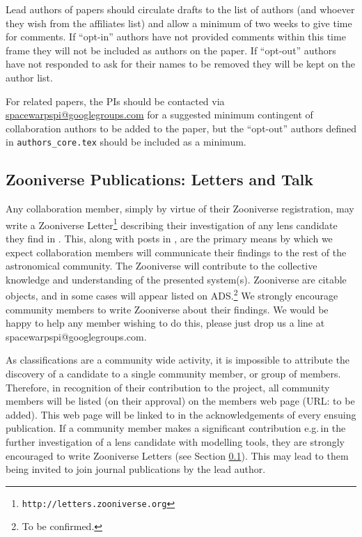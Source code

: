 \documentclass[a4paper]{article}
\begin{document}
Lead authors of \sw papers should circulate drafts to the list of authors (and whoever they wish from the affiliates list) and allow a minimum of two weeks to give time for comments. If  ``opt-in'' authors have not provided comments within this time frame they will not be included as authors on the paper. If ``opt-out'' authors have not responded to ask for their names to be removed they will be kept on the author list.

For \sw related papers, the \sw PIs should be contacted via \href{mailto:spacewarpspi@googlegroups.com}{spacewarpspi@googlegroups.com} for a suggested minimum contingent of collaboration authors to be added to the paper, but the ``opt-out'' authors defined in \texttt{authors\_core.tex} should be included as a minimum. 



\subsection{Zooniverse Publications: Letters and Talk }
\label{sec:zoolet}


Any \sw collaboration member, simply by virtue of their Zooniverse
registration, may write a Zooniverse
Letter\footnote{\texttt{http://letters.zooniverse.org}} describing their
investigation of any lens candidate they find in \sw. This, along with
posts in  \Talk, are the primary means by which we expect collaboration
members will communicate their findings to the rest of the
astronomical community. 
The \sw Zooniverse \Letters will contribute to the collective knowledge and understanding of the presented system(s). 
Zooniverse \Letters are citable
objects, and in some cases will appear listed on ADS.\footnote{To be confirmed.}
We strongly encourage community members to write Zooniverse \Letters about their findings. We would be happy to help any member wishing to do this, please just drop us a line at spacewarpspi@googlegroups.com. 


As \sw classifications are a community wide activity, it is impossible to attribute the discovery of a candidate to a single community member, or group  of members. Therefore, in recognition of their contribution to the \sw project, all \sw community members will be listed (on their approval) on the \sw members web page (URL: to be added). This web page will be linked to in the acknowledgements of every ensuing \sw publication. If a community member makes a significant contribution e.g.\,in the further investigation of a lens candidate with modelling tools, they are strongly encouraged to write Zooniverse Letters (see Section \ref{sec:zoolet}). This may lead to them being invited to join journal publications by the lead author.  
\end{document}
